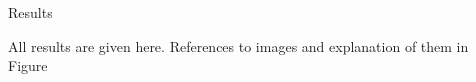 \begin{section}{Results}\label{sec:Results}

  All results are given here. References to images and explanation of
  them in Figure %

\end{section}
